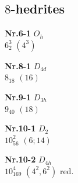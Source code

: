 \documentclass[12pt]{article}
\begin{document}
\begin{remark!!}
\subsection{$8$-hedrites}\label{subsection-8-hedrites}
{\small
\setlength{\unitlength}{1cm}
\begin{minipage}[t]{3.5cm}
\centering
\epsfxsize=2.5cm
\par
{{\bf Nr.6-1} \quad $O_h$\\ $6^3_2$ \quad $(4^3)$\\\vspace{3mm} }
\end{minipage}
\setlength{\unitlength}{1cm}
\begin{minipage}[t]{3.5cm}
\centering
\epsfxsize=2.5cm
\par
{{\bf Nr.8-1} \quad $D_{4d}$\\ $8_{18}$ \quad $(16)$\\\vspace{3mm} }
\end{minipage}
\setlength{\unitlength}{1cm}
\begin{minipage}[t]{3.5cm}
\centering
\epsfxsize=2.5cm
\par
{{\bf Nr.9-1} \quad $D_{3h}$\\ $9_{40}$ \quad $(18)$\\\vspace{3mm} }
\end{minipage}
\setlength{\unitlength}{1cm}
\begin{minipage}[t]{3.5cm}
\centering
\epsfxsize=2.5cm
\par
{{\bf Nr.10-1} \quad $D_{2}$\\ $10^2_{56}$ \quad $(6;14)$\\\vspace{3mm} }
\end{minipage}
\setlength{\unitlength}{1cm}
\begin{minipage}[t]{3.5cm}
\centering
\epsfxsize=2.5cm
\par
{{\bf Nr.10-2} \quad $D_{4h}$\\ $10^4_{169}$ \quad $(4^2,6^2)$ red.\\\vspace{3mm} }
\end{minipage}
\setlength{\unitlength}{1cm}
\begin{minipage}[t]{3.5cm}
\centering
\epsfxsize=2.5cm
\par

\end{minipage}}
\end{remark!!}
\end{document}
